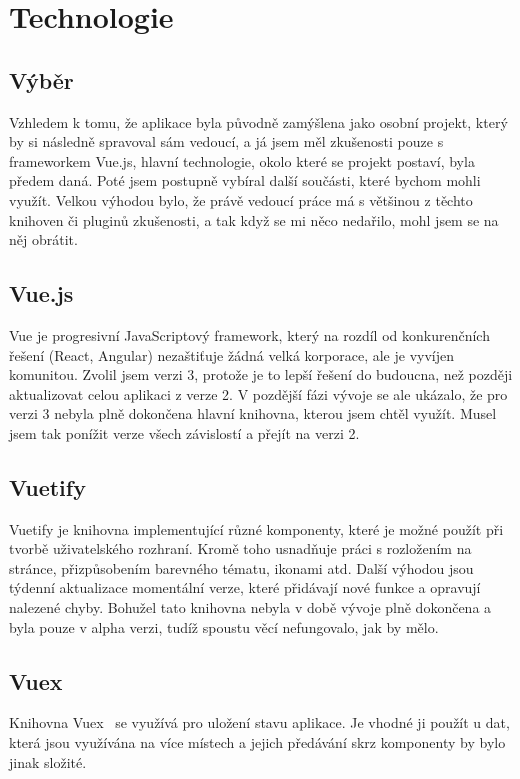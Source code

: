 
\chapter{Technologie}

\section{Výběr}
Vzhledem k tomu, že aplikace byla původně zamýšlena jako osobní projekt, který by si následně spravoval sám vedoucí, a já
jsem měl zkušenosti pouze s frameworkem Vue.js, hlavní technologie, okolo které se projekt postaví, byla předem daná. Poté
jsem postupně vybíral další součásti, které bychom mohli využít. Velkou výhodou bylo, že právě vedoucí práce má s většinou
z těchto knihoven či pluginů zkušenosti, a tak když se mi něco nedařilo, mohl jsem se na něj obrátit.

\section{Vue.js}
Vue je progresivní JavaScriptový framework, který na rozdíl od konkurenčních řešení (React, Angular) nezaštiťuje žádná velká
korporace, ale je vyvíjen komunitou.\cite{VueJS} Zvolil jsem verzi 3, protože je to lepší řešení do budoucna, než později aktualizovat
celou aplikaci z verze 2. V pozdější fázi vývoje se ale ukázalo, že pro verzi 3 nebyla plně dokončena hlavní knihovna, kterou jsem chtěl využít.
Musel jsem tak ponížit verze všech závislostí a přejít na verzi 2.

\section{Vuetify}
Vuetify je knihovna implementující různé komponenty, které je možné použít při tvorbě uživatelského rozhraní. Kromě toho
usnadňuje práci s rozložením na stránce, přizpůsobením barevného tématu, ikonami atd. Další výhodou jsou týdenní aktualizace
momentální verze, které přidávají nové funkce a opravují nalezené chyby.\cite{VuetifyWhy}
Bohužel tato knihovna nebyla v době vývoje plně dokončena a byla pouze v alpha verzi, tudíž spoustu věcí nefungovalo, jak by mělo.

\section{Vuex}
Knihovna Vuex~\cite{Vuex} se využívá pro uložení stavu aplikace. Je vhodné ji použít u dat, která jsou využívána na více místech a jejich
předávání skrz komponenty by bylo jinak složité.

